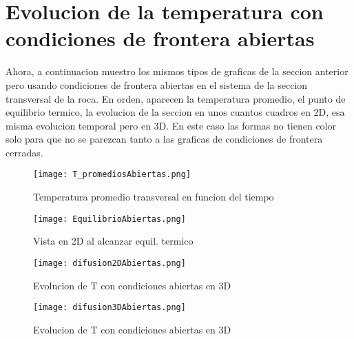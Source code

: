 \documentclass[13pts]{article}
\begin{document}
\section{Evolucion de la temperatura con condiciones de frontera abiertas}
Ahora, a continuacion muestro los mismos tipos de graficas de la seccion anterior pero usando condiciones de frontera abiertas en el sistema de la seccion transversal de la roca. En orden, aparecen la temperatura promedio, el punto de equilibrio termico, la evolucion de la seccion en unos cuantos cuadros en 2D, esa misma evolucion temporal pero en 3D. En este caso las formas no tienen color solo para que no se parezcan tanto a las graficas de condiciones de frontera cerradas.\\
\begin{figure}
	\centering
	\texttt{[image: T\_promediosAbiertas.png]}
	\caption{Temperatura promedio transversal en funcion del tiempo}
	\label{promedioAbiertas}
\end{figure}
\begin{figure}
	\centering
	\texttt{[image: EquilibrioAbiertas.png]}
	\caption{Vista en 2D al alcanzar equil. termico}
	\label{equilAbiertas}
\end{figure}
\begin{figure}
	\centering
	\texttt{[image: difusion2DAbiertas.png]}
	\caption{Evolucion de T con condiciones abiertas en 3D}
	\label{2DAbiertas}
\end{figure}
\begin{figure}
	\centering
	\texttt{[image: difusion3DAbiertas.png]}
	\caption{Evolucion de T con condiciones abiertas en 3D}
	\label{3DAbiertas}
\end{figure}\\
\end{document}

